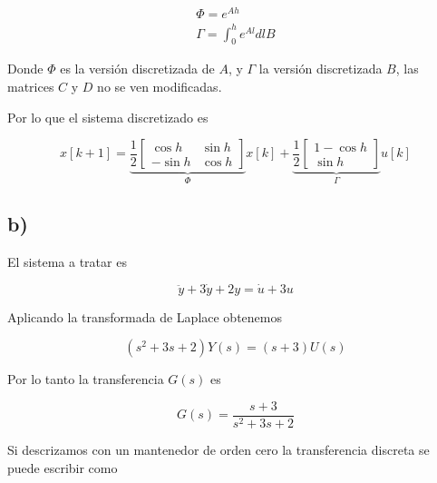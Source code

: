 \documentclass{article}
\begin{document}
    \begin{equation}
        \begin{array}{c}
            \Phi = e^{Ah} \\ 
        \Gamma = \int_0^h e^{Al}dl B
        \end{array}
    \end{equation}

    Donde $\Phi$ es la versión discretizada de $A$, y $\Gamma$ la versión discretizada $B$, las matrices $C$ y $D$ no se ven modificadas.

    Por lo que el sistema discretizado es 

    \begin{equation}
        x[k+1] = 
        \underbrace{
            \frac{1}{2}
            \begin{bmatrix}
                \cos{h} & \sin{h} \\ 
                -\sin{h} & \cos{h}   
            \end{bmatrix}
        }_{\Phi} x[k] + 
        \underbrace{
            \frac{1}{2}
            \begin{bmatrix}
                1 - \cos{h} \\ 
                \sin{h}
            \end{bmatrix}
        }_{\Gamma} u[k]
    \end{equation}

    \subsection{b)}
        El sistema a tratar es 

        \begin{equation}
            \ddot{y} + 3 \dot{y} + 2 y = \dot{u} + 3u
        \end{equation}

        Aplicando la transformada de Laplace obtenemos 

        \begin{equation}
            (s^{2} + 3s + 2)Y(s) = (s + 3)U(s)
        \end{equation}

        Por lo tanto la transferencia $G(s)$ es 

        \begin{equation}
            G(s) = \frac{s+3}{s^2 + 3s + 2}
        \end{equation}

        Si descrizamos con un mantenedor de orden cero la transferencia discreta se puede escribir como 
\end{document}
